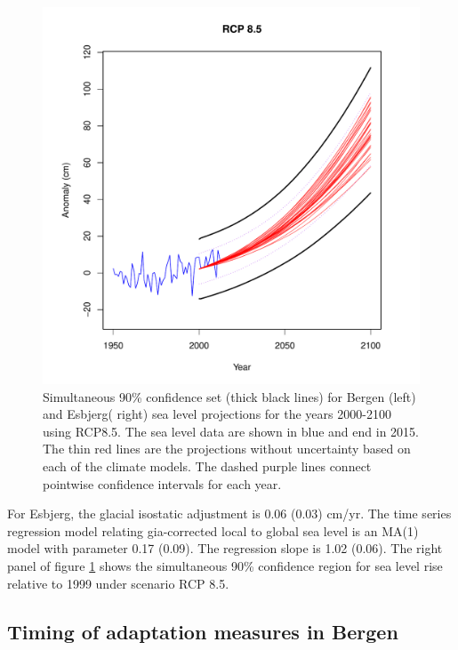 \documentclass[note,screen,british,11pt]{nrdoc}
\begin{document}
\begin{figure}[!hbpt]
\begin{center}
\begin{minipage}{.5\textwidth}
    \includegraphics[width=\linewidth]{esbjerg_ci.pdf}

\end{minipage}
\caption{Simultaneous 90\% confidence set (thick black lines) for Bergen (left) and Esbjerg( right) sea level projections for the years 2000-2100 using RCP8.5. The sea level data are shown in blue and end in 2015. The thin red lines are the projections without uncertainty based on each of the climate models. The dashed purple lines connect pointwise confidence intervals for each year. }
\label{fig:ci}
\end{center}
\end{figure}

For Esbjerg, the glacial isostatic adjustment is 0.06 (0.03) cm/yr. The time series regression model relating gia-corrected local to global sea level is an MA(1) model with parameter 0.17 (0.09). The regression slope is 1.02 (0.06). The right panel of figure \ref{fig:ci} shows the simultaneous 90\% confidence region for sea level rise relative to 1999 under scenario RCP 8.5.

\subsection{Timing of adaptation measures in Bergen}
\end{document}
